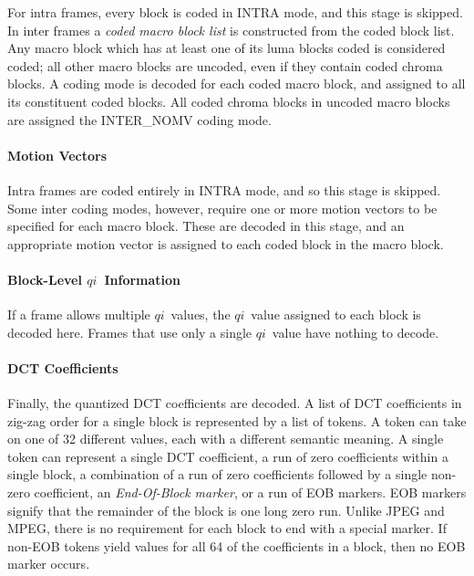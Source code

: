 \documentclass[9pt,letterpaper]{book}
\newcommand{\idx}[1]{{\ensuremath{\mathit{#1}}}}
\newcommand{\qi}{\idx{qi}}
\newcommand{\term}[1]{{\em #1}}
\numberwithin{equation}{chapter}
\numberwithin{figure}{chapter}
\numberwithin{table}{chapter}
\begin{document}
For intra frames, every block is coded in INTRA mode, and this stage is
 skipped.
In inter frames a \term{coded macro block list} is constructed from the coded
 block list.
Any macro block which has at least one of its luma blocks coded is considered
 coded; all other macro blocks are uncoded, even if they contain coded chroma
 blocks.
A coding mode is decoded for each coded macro block, and assigned to all its
 constituent coded blocks.
All coded chroma blocks in uncoded macro blocks are assigned the INTER\_NOMV
 coding mode.

\paragraph{Motion Vectors}

Intra frames are coded entirely in INTRA mode, and so this stage is skipped.
Some inter coding modes, however, require one or more motion vectors to be
 specified for each macro block.
These are decoded in this stage, and an appropriate motion vector is assigned
 to each coded block in the macro block.

\paragraph{Block-Level \qi\ Information}

If a frame allows multiple \qi\ values, the \qi\ value assigned to each block
 is decoded here.
Frames that use only a single \qi\ value have nothing to decode.

\paragraph{DCT Coefficients}

Finally, the quantized DCT coefficients are decoded.
A list of DCT coefficients in zig-zag order for a single block is represented
 by a list of tokens.
A token can take on one of 32 different values, each with a different semantic
 meaning.
A single token can represent a single DCT coefficient, a run of zero
 coefficients within a single block, a combination of a run of zero
 coefficients followed by a single non-zero coefficient, an
 \term{End-Of-Block marker}, or a run of EOB markers.
EOB markers signify that the remainder of the block is one long zero run.
Unlike JPEG and MPEG, there is no requirement for each block to end with 
 a special marker.
If non-EOB tokens yield values for all 64 of the coefficients in a block, then
 no EOB marker occurs.
\end{document}
